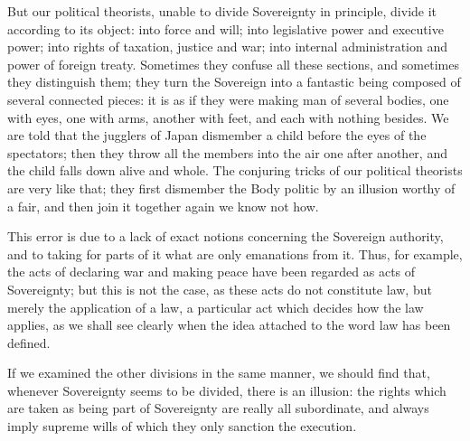 \documentclass[12pt]{report}
\begin{document}
But our political theorists, unable to divide Sovereignty in principle, divide it according to its object: into force and will; into legislative power and executive power; into rights of taxation, justice and war; into internal administration and power of foreign treaty. Sometimes they confuse all these sections, and sometimes they distinguish them; they turn the Sovereign into a fantastic being composed of several connected pieces: it is as if they were making man of several bodies, one with eyes, one with arms, another with feet, and each with nothing besides. We are told that the jugglers of Japan dismember a child before the eyes of the spectators; then they throw all the members into the air one after another, and the child falls down alive and whole. The conjuring tricks of our political theorists are very like that; they first dismember the Body politic by an illusion worthy of a fair, and then join it together again we know not how.

This error is due to a lack of exact notions concerning the Sovereign authority, and to taking for parts of it what are only emanations from it. Thus, for example, the acts of declaring war and making peace have been regarded as acts of Sovereignty; but this is not the case, as these acts do not constitute law, but merely the application of a law, a particular act which decides how the law applies, as we shall see clearly when the idea attached to the word law has been defined.

If we examined the other divisions in the same manner, we should find that, whenever Sovereignty seems to be divided, there is an illusion: the rights which are taken as being part of Sovereignty are really all subordinate, and always imply supreme wills of which they only sanction the execution.
\end{document}
